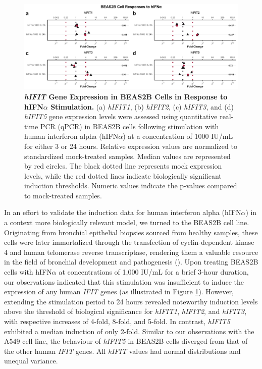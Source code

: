 \begin{figure}
    \centering
    \includegraphics[width=1\linewidth]{06. Chapter 1/Figs/01. Induction/05. beas2b_ifna.pdf}
    \caption[\textit{hIFIT} Gene Expression in BEAS2B Cells in Response to hIFN\(\alpha\) Stimulation.]{\textbf{\textit{hIFIT} Gene Expression in BEAS2B Cells in Response to hIFN\(\alpha\) Stimulation.} (a) \textit{hIFIT1}, (b) \textit{hIFIT2}, (c) \textit{hIFIT3}, and (d) \textit{hIFIT5} gene expression levels were assessed using quantitative real-time PCR (qPCR) in BEAS2B cells following stimulation with human interferon alpha (hIFN\(\alpha\)) at a concentration of 1000 IU/mL for either 3 or 24 hours. Relative expression values are normalized to standardized mock-treated samples. Median values are represented by red circles. The black dotted line represents mock expression levels, while the red dotted lines indicate biologically significant induction thresholds. Numeric values indicate the p-values compared to mock-treated samples.}
    \label{fig:BEAS2B responses to hIFNa}
\end{figure}

In an effort to validate the induction data for human interferon alpha (hIFN\(\alpha\)) in a context more biologically relevant model, we turned to the BEAS2B cell line. Originating from bronchial epithelial biopsies sourced from healthy samples, these cells were later immortalized through the transfection of cyclin-dependent kinase 4 and human telomerase reverse transcriptase, rendering them a valuable resource in the field of bronchial development and pathogenesis (\cite{Ramirez2004ImmortalizationOncoproteins}). Upon treating BEAS2B cells with hIFN\(\alpha\) at concentrations of 1,000 IU/mL for a brief 3-hour duration, our observations indicated that this stimulation was insufficient to induce the expression of any human \textit{IFIT} genes (as illustrated in Figure \ref{fig:BEAS2B responses to hIFNa}). However, extending the stimulation period to 24 hours revealed noteworthy induction levels above the threshold of biological significance for \textit{hIFIT1}, \textit{hIFIT2}, and \textit{hIFIT3}, with respective increases of 4-fold, 8-fold, and 5-fold. In contrast, \textit{hIFIT5} exhibited a median induction of only 2-fold. Similar to our observations with the A549 cell line, the behaviour of \textit{hIFIT5} in BEAS2B cells diverged from that of the other human \textit{IFIT} genes. All \textit{hIFIT} values had normal distributions and unequal variance.

